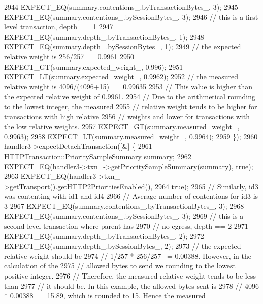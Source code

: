 \begin{DoxyCode}
2944       EXPECT\_EQ(summary.contentions_.byTransactionBytes_, 3);
2945       EXPECT\_EQ(summary.contentions_.bySessionBytes_, 3);
2946       \textcolor{comment}{// this is a first level transaction, depth == 1}
2947       EXPECT\_EQ(summary.depth_.byTransactionBytes_, 1);
2948       EXPECT\_EQ(summary.depth_.bySessionBytes_, 1);
2949       \textcolor{comment}{// the expected relative weight is 256/257 ~= 0.9961}
2950       EXPECT\_GT(summary.expected_weight_, 0.996);
2951       EXPECT\_LT(summary.expected_weight_, 0.9962);
2952       \textcolor{comment}{// the measured relative weight is 4096/(4096+15) ~= 0.99635}
2953       \textcolor{comment}{// This value is higher than the expected relative weight of 0.9961.}
2954       \textcolor{comment}{// Due to the arithmetical rounding to the lowest integer, the measured}
2955       \textcolor{comment}{// relative weight tends to be higher for transactions with high relative}
2956       \textcolor{comment}{// weights and lower for transactions with the low relative weights.}
2957       EXPECT\_GT(summary.measured_weight_, 0.9963);
2958       EXPECT\_LT(summary.measured_weight_, 0.9964);
2959     \});
2960   handler3->expectDetachTransaction([&] \{
2961       HTTPTransaction::PrioritySampleSummary summary;
2962       EXPECT\_EQ(handler3->txn\_->getPrioritySampleSummary(summary), \textcolor{keyword}{true});
2963       EXPECT\_EQ(handler3->txn\_->getTransport().getHTTP2PrioritiesEnabled(),
2964                 \textcolor{keyword}{true});
2965       \textcolor{comment}{// Similarly, id3 was contenting with id1 and id4}
2966       \textcolor{comment}{// Average number of contentions for id3 is 3}
2967       EXPECT\_EQ(summary.contentions_.byTransactionBytes_, 3);
2968       EXPECT\_EQ(summary.contentions_.bySessionBytes_, 3);
2969       \textcolor{comment}{// this is a second level transaction where parent has}
2970       \textcolor{comment}{// no egress, depth == 2}
2971       EXPECT\_EQ(summary.depth_.byTransactionBytes_, 2);
2972       EXPECT\_EQ(summary.depth_.bySessionBytes_, 2);
2973       \textcolor{comment}{// the expected relative weight should be}
2974       \textcolor{comment}{// 1/257 * 256/257 ~= 0.00388. However, in the calculation of the}
2975       \textcolor{comment}{// allowed bytes to send we rounding to the lowest positive integer.}
2976       \textcolor{comment}{// Therefore, the measured relative weight tends to be less than}
2977       \textcolor{comment}{// it should be.  In this example, the allowed bytes sent is}
2978       \textcolor{comment}{// 4096 * 0.00388 ~= 15.89, which is rounded to 15. Hence the measured}

\end{DoxyCode}
